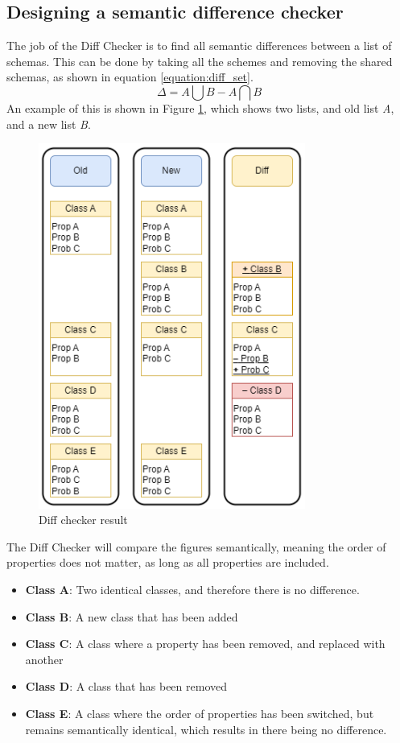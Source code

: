 \subsection{Designing a semantic difference checker \label{sec:design:diff_checker}}
The job of the Diff Checker is to find all semantic differences between a list of schemas.
This can be done by taking all the schemes and removing the shared schemas, as shown in equation \ref{equation:diff_set}.
\begin{equation}
\label{equation:diff_set}
    \Delta = A \bigcup B - A \bigcap B
\end{equation}
\noindent
An example of this is shown in Figure \ref{fig:diff_checker}, which shows two lists, and old list \textit{A}, and a new list \textit{B}.
\begin{figure}[h ]
    \centering
    \includegraphics[height=12cm]{figures/assets/diff_checker.png}
    \caption{Diff checker result}
    \label{fig:diff_checker}
\end{figure}
\noindent
The Diff Checker will compare the figures semantically, meaning the order of properties does not matter, as long as all properties are included.
\begin{itemize}
    \item \textbf{Class A}: Two identical classes, and therefore there is no difference.
    \item \textbf{Class B}: A new class that has been added
    \item \textbf{Class C}: A class where a property has been removed, and replaced with another
    \item \textbf{Class D}: A class that has been removed
    \item \textbf{Class E}: A class where the order of properties has been switched, but remains semantically identical, which results in there being no difference.
\end{itemize}
